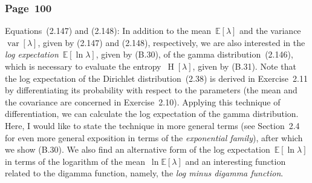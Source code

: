 \documentclass[12pt,a4paper]{article}
\newcommand{\erratum}[1]{%
\subsubsection*{#1}
\addcontentsline{toc}{subsection}{#1}}
\begin{document}
\erratum{Page~100}
Equations~(2.147) and (2.148):
In addition to the mean~$\mathbb{E}[\lambda]$ and
the variance~$\operatorname{var}[\lambda]$, given by (2.147) and (2.148), respectively,
we are also interested in
the \emph{log expectation}~$\mathbb{E}\left[ \ln\lambda \right]$, given by (B.30),
of the gamma distribution~(2.146),
which is necessary to evaluate
the entropy~$\operatorname{H}\left[ \lambda \right]$, given by (B.31).
Note that the log expectation of the Dirichlet distribution~(2.38) is
derived in Exercise~2.11 by differentiating its probability with respect to the parameters
(the mean and the covariance are concerned in Exercise~2.10).
Applying this technique of differentiation,
we can calculate the log expectation of the gamma distribution.
Here, I would like to state the technique in more general terms
(see Section~2.4 for even more general exposition in terms of the \emph{exponential family}),
after which we show (B.30).
We also find an alternative form of the log expectation~$\mathbb{E}\left[ \ln\lambda \right]$
in terms of the logarithm of the mean~$\ln\mathbb{E}[\lambda]$ and
an interesting function related to the digamma function, namely,
the \emph{log minus digamma function}.
\end{document}
